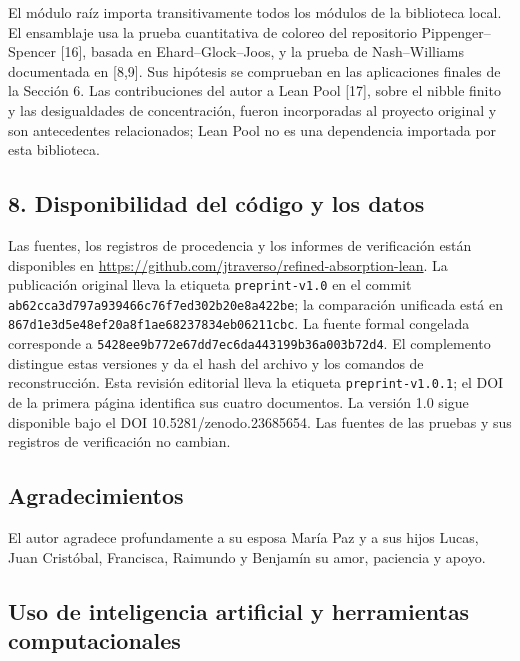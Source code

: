 \documentclass[spanish,11pt,a4paper]{article}
\begin{document}
El módulo raíz importa transitivamente todos los módulos de la biblioteca local. El ensamblaje usa la prueba cuantitativa de coloreo del repositorio Pippenger--Spencer {[}16{]}, basada en Ehard--Glock--Joos, y la prueba de Nash--Williams documentada en {[}8,9{]}. Sus hipótesis se comprueban en las aplicaciones finales de la Sección 6. Las contribuciones del autor a Lean Pool {[}17{]}, sobre el nibble finito y las desigualdades de concentración, fueron incorporadas al proyecto original y son antecedentes relacionados; Lean Pool no es una dependencia importada por esta biblioteca.

\subsection{8. Disponibilidad del código y los datos}\label{disponibilidad-del-cuxf3digo-y-los-datos}

Las fuentes, los registros de procedencia y los informes de verificación están disponibles en \url{https://github.com/jtraverso/refined-absorption-lean}. La publicación original lleva la etiqueta \texttt{preprint-v1.\allowbreak{}0} en el commit \texttt{ab62cca3\allowbreak{}d797a939\allowbreak{}466c76f7\allowbreak{}ed302b20\allowbreak{}e8a422be}; la comparación unificada está en \texttt{867d1e3d\allowbreak{}5e48ef20\allowbreak{}a8f1ae68\allowbreak{}237834eb\allowbreak{}06211cbc}. La fuente formal congelada corresponde a \texttt{5428ee9b\allowbreak{}772e67dd\allowbreak{}7ec6da44\allowbreak{}3199b36a\allowbreak{}003b72d4}. El complemento distingue estas versiones y da el hash del archivo y los comandos de reconstrucción. Esta revisión editorial lleva la etiqueta \texttt{preprint-v1.\allowbreak{}0.\allowbreak{}1}; el DOI de la primera página identifica sus cuatro documentos. La versión 1.0 sigue disponible bajo el DOI 10.5281/zenodo.23685654. Las fuentes de las pruebas y sus registros de verificación no cambian.

\subsection{Agradecimientos}\label{agradecimientos}

El autor agradece profundamente a su esposa María Paz y a sus hijos Lucas, Juan Cristóbal, Francisca, Raimundo y Benjamín su amor, paciencia y apoyo.

\subsection{Uso de inteligencia artificial y herramientas computacionales}\label{uso-de-inteligencia-artificial-y-herramientas-computacionales}
\end{document}
